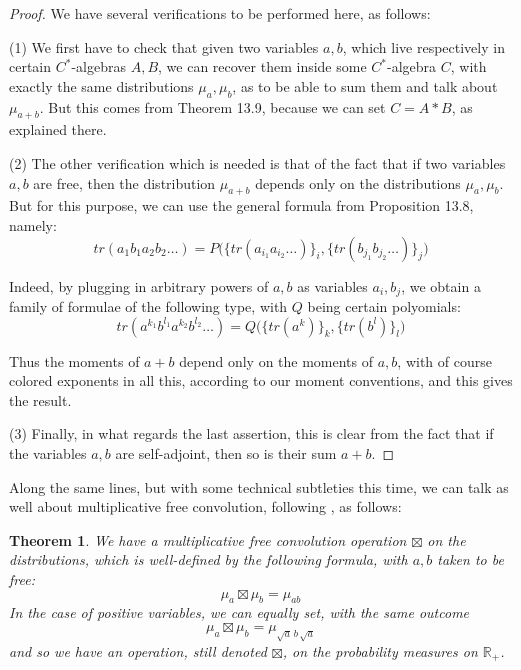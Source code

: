 \documentclass[12pt]{amsbook}
\newtheorem{theorem}{Theorem}[chapter]
\begin{document}
\begin{proof}
We have several verifications to be performed here, as follows:

\medskip

(1) We first have to check that given two variables $a,b$, which live respectively in certain $C^*$-algebras $A,B$, we can recover them inside some $C^*$-algebra $C$, with exactly the same distributions $\mu_a,\mu_b$, as to be able to sum them and talk about $\mu_{a+b}$. But this comes from Theorem 13.9, because we can set $C=A*B$, as explained there.

\medskip

(2) The other verification which is needed is that of the fact that if two variables $a,b$ are free, then the distribution $\mu_{a+b}$ depends only on the distributions $\mu_a,\mu_b$. But for this purpose, we can use the general formula from Proposition 13.8, namely:
$$tr(a_1b_1a_2b_2\ldots)=P\Big(\{tr(a_{i_1}a_{i_2}\ldots)\}_i,\{tr(b_{j_1}b_{j_2}\ldots)\}_j\Big)$$

Indeed, by plugging in arbitrary powers of $a,b$ as variables $a_i,b_j$, we obtain a family of formulae of the following type, with $Q$ being certain polyomials:
$$tr(a^{k_1}b^{l_1}a^{k_2}b^{l_2}\ldots)=Q\Big(\{tr(a^k)\}_k,\{tr(b^l)\}_l\Big)$$

Thus the moments of $a+b$ depend only on the moments of $a,b$, with of course colored exponents in all this, according to our moment conventions, and this gives the result.

\medskip

(3) Finally, in what regards the last assertion, this is clear from the fact that if the variables $a,b$ are self-adjoint, then so is their sum $a+b$.
\end{proof}

Along the same lines, but with some technical subtleties this time, we can talk as well about multiplicative free convolution, following \cite{vo2}, as follows:


\begin{theorem}
We have a multiplicative free convolution operation $\boxtimes$ on the distributions, which is well-defined by the following formula, with $a,b$ taken to be free:
$$\mu_a\boxtimes\mu_b=\mu_{ab}$$
In the case of positive variables, we can equally set, with the same outcome
$$\mu_a\boxtimes\mu_b=\mu_{\sqrt{a}\,b\,\sqrt{a}}$$
and so we have an operation, still denoted $\boxtimes$, on the probability measures on $\mathbb R_+$.
\end{theorem}
\end{document}
